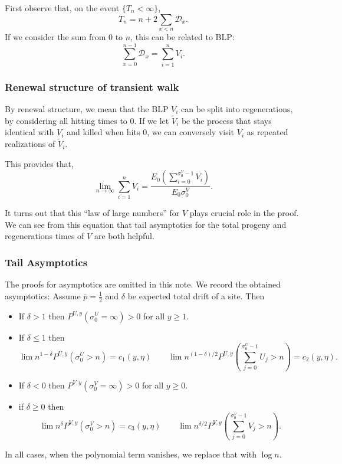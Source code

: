 First observe that, on the event $\{T_n < \infty \} $,
\[
	T_n = n + 2 \sum_{x < n} \mathcal{D}_x
.\] 
If we consider the sum from $0$ to $n$, this can be related to BLP:
\[
	\sum_{x = 0}^{n-1} \mathcal{D}_x = \sum_{i = 1}^n V_i
.\] 



\subsubsection{Renewal structure of transient walk}

By renewal structure, we mean that the BLP $V_i$ can be split into regenerations, by considering all hitting times to $0$. If we let $\tilde V_i$ be the process that stays identical with $V_i$ and killed when hits $0$, we can conversely visit $V_i  $ as repeated realizations of $\tilde V_i$.

This provides that, 
\[
	\lim_{n \to \infty } \sum_{i = 1}^n V_i
	= \frac{E_0\left( \sum _{i = 0}^{\sigma_0^V - 1} V_i \right) }{E_0 \sigma_0^V}
.\] 

It turns out that this ``law of large numbers'' for $V$ plays crucial role in the proof. We can see from this equation that tail asymptotics for the total progeny and regenerations times of $V$ are both helpful.

\subsubsection{Tail Asymptotics}

The proofs for asymptotics are omitted in this note. We record the obtained asymptotics: Assume $\overline{p}  = \frac{1}{2}$ and $\delta$ be expected total drift of a site. Then
\begin{itemize}
	\item If $\delta>1$ then $P^{U, y} (\sigma_0^U = \infty ) > 0$ for all $y \ge 1$.
	\item If $\delta \le 1$ then 
	\[
		\lim n^{1 - \delta} P^{U, y}\left( \sigma_0^U > n \right)  = c_1(y, \eta) \qquad
		\lim n^{(1 - \delta) / 2}P^{U, y}\left( \sum_{j = 0}^{\sigma_0^U - 1}U_j > n \right)  = c_2(y, \eta)
	.\] 
\item If $\delta < 0$ then $P^{V, y}(\sigma_0^V = \infty ) > 0$ for all $y \ge 0$.
\item if $\delta \ge 0$ then 
	\[
		\lim n^\delta P^{V, y}(\sigma_0^V > n) = c_3(y, \eta) \qquad
		\lim n^{\delta / 2} P^{V, y}\left( \sum_{j = 0}^{\sigma_0^V - 1} V_j > n \right) 
	.\] 
\end{itemize}
In all cases, when the polynomial term vanishes, we replace that with $\log n$.

